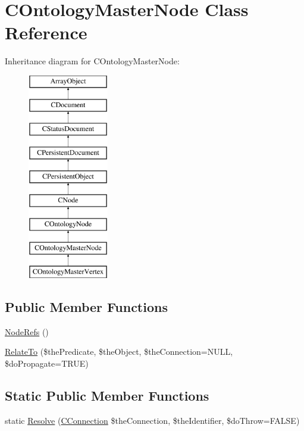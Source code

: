 \hypertarget{class_c_ontology_master_node}{\section{C\-Ontology\-Master\-Node Class Reference}
\label{class_c_ontology_master_node}
}
Inheritance diagram for C\-Ontology\-Master\-Node\-:\begin{figure}[H]
\begin{center}
\leavevmode
\includegraphics[height=9.000000cm]{class_c_ontology_master_node}
\end{center}
\end{figure}
\subsection*{Public Member Functions}
\begin{DoxyCompactItemize}
\item 
\hyperlink{class_c_ontology_master_node_a1dbcd0aa39c97027ebf020eda30c9c85}{Node\-Refs} ()
\item 
\hyperlink{class_c_ontology_master_node_a3b17a7706f8297c2735bd8035995762a}{Relate\-To} (\$the\-Predicate, \$the\-Object, \$the\-Connection=N\-U\-L\-L, \$do\-Propagate=T\-R\-U\-E)
\end{DoxyCompactItemize}
\subsection*{Static Public Member Functions}
\begin{DoxyCompactItemize}
\item 
static \hyperlink{class_c_ontology_master_node_a29aadfcab71c78e4f4a107aad67a8ebe}{Resolve} (\hyperlink{class_c_connection}{C\-Connection} \$the\-Connection, \$the\-Identifier, \$do\-Throw=F\-A\-L\-S\-E)
\end{DoxyCompactItemize}
